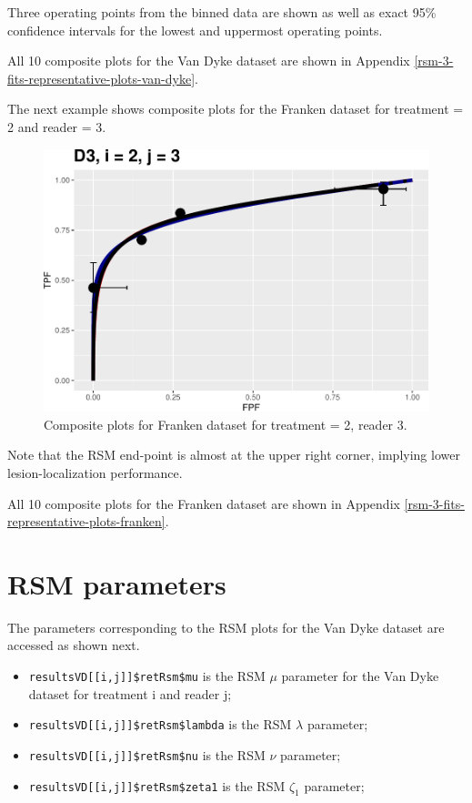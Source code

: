 \documentclass[
]{book}
\providecommand{\tightlist}{%
  \setlength{\itemsep}{0pt}\setlength{\parskip}{0pt}}
\begin{document}
Three operating points from the binned data are shown as well as exact 95\% confidence intervals for the lowest and uppermost operating points.

All 10 composite plots for the Van Dyke dataset are shown in Appendix \ref{rsm-3-fits-representative-plots-van-dyke}.

The next example shows composite plots for the Franken dataset for treatment = 2 and reader = 3.

\begin{figure}
\centering
\includegraphics{12-rsm-3-fits_files/figure-latex/rsm-3-fits-plots-fr-23-1.pdf}
\caption{\label{fig:rsm-3-fits-plots-fr-23}Composite plots for Franken dataset for treatment = 2, reader 3.}
\end{figure}

Note that the RSM end-point is almost at the upper right corner, implying lower lesion-localization performance.

All 10 composite plots for the Franken dataset are shown in Appendix \ref{rsm-3-fits-representative-plots-franken}.

\hypertarget{rsm-3-fits-rsm-parameters}{%
\section{RSM parameters}\label{rsm-3-fits-rsm-parameters}}

The parameters corresponding to the RSM plots for the Van Dyke dataset are accessed as shown next.

\begin{itemize}
\tightlist
\item
  \texttt{resultsVD{[}{[}i,j{]}{]}\$retRsm\$mu} is the RSM \(\mu\) parameter for the Van Dyke dataset for treatment i and reader j;
\item
  \texttt{resultsVD{[}{[}i,j{]}{]}\$retRsm\$lambda} is the RSM \(\lambda\) parameter;\\
\item
  \texttt{resultsVD{[}{[}i,j{]}{]}\$retRsm\$nu} is the RSM \(\nu\) parameter;
\item
  \texttt{resultsVD{[}{[}i,j{]}{]}\$retRsm\$zeta1} is the RSM \(\zeta_1\) parameter;
\end{itemize}
\end{document}
